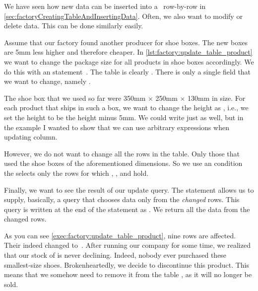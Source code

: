 %
%
%
%
%
%
%
%
We have seen how new data can be inserted into a \db\ row-by-row in \cref{sec:factoryCreatingTableAndInsertingData}.
Often, we also want to modify or delete data.
This can be done similarly easily.

Assume that our factory found another producer for shoe boxes.
The new boxes are 5mm less higher and therefore cheaper.
In \cref{lst:factory:update_table_product} we want to change the package size for all products in shoe boxes accordingly.
We do this with an  statement~\cite{PGDG:PD:U}.
The table is clearly .
There is only a single field that we want to change, namely .

The shoe box that we used so far were 350mm $\times$ 250mm $\times$ 130mm in size.
For each product that ships in such a box, we want to change the height as , i.e., we set the  height to be the  height minus 5mm.
We could write  just as well, but in the example I wanted to show that we can use arbitrary expressions when updating column.

However, we do not want to change all the rows in the table.
Only those that used the shoe boxes of the aforementioned dimensions.
So we use an  condition the selects only the rows for which , , and  hold.

Finally, we want to see the result of our update query.
The  statement allows us to supply, basically, a  query that chooses data only from the \emph{changed} rows.
This query is written at the end of the statement as .
We return all the data from the changed rows.

As you can see \cref{exec:factory:update_table_product}, nine rows are affected.
Their  indeed changed to~.
\endhsection%
%
%
%
%
%
%
After running our company for some time, we realized that our stock of  is never declining.
Indeed, nobody ever purchased these smallest-size shoes.
Brokenheartedly, we decide to discontinue this product.
This means that we somehow need to remove it from the table , as it will no longer be sold.

